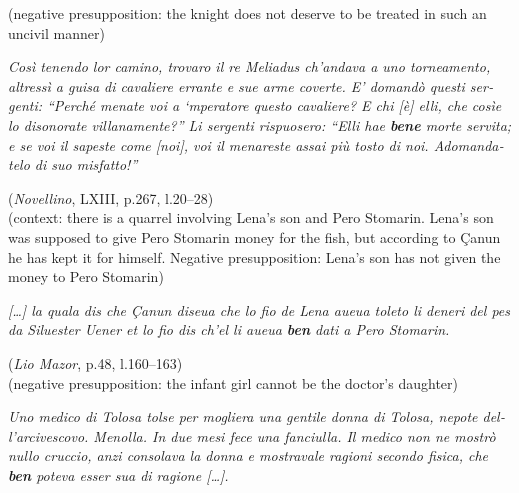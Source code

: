 \documentclass[output=paper]{langsci/langscibook}
\begin{document}
\ea\label{ex:schifano:12.7}
    \ea (negative presupposition: the knight does not deserve to be treated in
        such an uncivil manner)\\
        \begin{otherlanguage}{italian}\emph{Così tenendo lor camino, trovaro il re
        Meliadus ch’andava a uno torneamento, altressì a guisa di cavaliere errante
        e sue arme coverte. E’ domandò questi sergenti: “Perché menate voi a ‘mperatore
        questo cavaliere? E chi [è] elli, che cosìe lo disonorate villanamente?” Li
        sergenti rispuosero: “Elli hae \textbf{bene} morte servita; e se voi il sapeste
        come [noi], voi il menareste assai più tosto di noi. Adomandatelo di suo
        misfatto!”}\end{otherlanguage}\hfill(\emph{Novellino}, LXIII, p.267, l.20--28)\\
    \ex (context: there is a quarrel involving Lena’s son and Pero Stomarin.
        Lena’s son was supposed to give Pero Stomarin money for the fish, but
        according to Çanun he has kept it for himself. Negative presupposition:
        Lena’s son has not given the money to Pero Stomarin)\\
        \begin{otherlanguage}{italian}\emph{[\dots] la quala dis che Çanun diseua che lo fio de Lena aueua
        toleto li deneri del pes da Siluester Uener et lo fio dis ch’el li
        aueua \textbf{ben} dati a Pero Stomarin.}\end{otherlanguage}\hfill
        (\emph{Lio Mazor}, p.48, l.160--163)\\
    \ex (negative presupposition: the infant girl cannot be the doctor’s
        daughter)\\
        \begin{otherlanguage}{italian}\emph{Uno medico di Tolosa tolse per mogliera una gentile donna di
        Tolosa, nepote dell’arcivescovo. Menolla. In due mesi fece una
        fanciulla. Il medico non ne mostrò nullo cruccio, anzi consolava la
        donna e mostravale ragioni secondo fisica, che \textbf{ben} poteva
        esser sua di ragione [\dots{}].}\end{otherlanguage}\hfill
\end{document}
